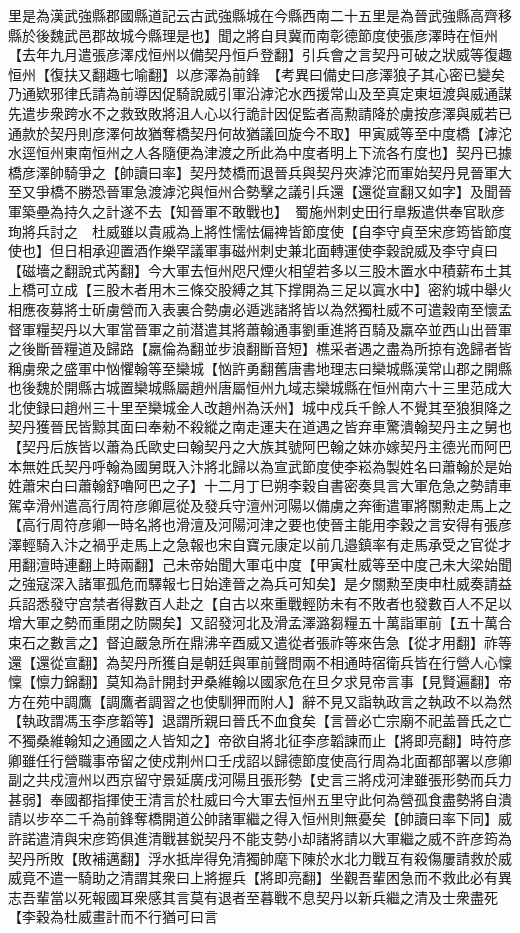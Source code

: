 里是為漢武強縣郡國縣道記云古武強縣城在今縣西南二十五里是為晉武強縣高齊移縣於後魏武邑郡故城今縣理是也】聞之將自貝冀而南彰德節度使張彦澤時在恒州【去年九月遣張彦澤戍恒州以備契丹恒戶登翻】引兵會之言契丹可破之狀威等復趣恒州【復扶又翻趣七喻翻】以彦澤為前鋒　【考異曰備史曰彦澤狼子其心密已變矣乃通欵邪律氏請為前導因促騎說威引軍沿滹沱水西援常山及至真定東垣渡與威通謀先遣步衆跨水不之救致敗將沮人心以行詭計因促監者高勲請降於虜按彦澤與威若已通款於契丹則彦澤何故猶奪橋契丹何故猶議回旋今不取】甲寅威等至中度橋【滹沱水逕恒州東南恒州之人各隨便為津渡之所此為中度者明上下流各冇度也】契丹已據橋彦澤帥騎爭之【帥讀曰率】契丹焚橋而退晉兵與契丹夾滹沱而軍始契丹見晉軍大至又爭橋不勝恐晉軍急渡滹沱與恒州合勢擊之議引兵還【還從宣翻又如字】及聞晉軍築壘為持久之計遂不去【知晉軍不敢戰也】　蜀施州刺史田行臯叛遣供奉官耿彦珣將兵討之　杜威雖以貴戚為上將性懦怯偏禆皆節度使【自李守貞至宋彦筠皆節度使也】但日相承迎置酒作樂罕議軍事磁州刺史兼北面轉運使李穀說威及李守貞曰【磁墻之翻說式芮翻】今大軍去恒州咫尺煙火相望若多以三股木置水中積薪布土其上橋可立成【三股木者用木三條交股縛之其下撑開為三足以寘水中】密約城中舉火相應夜募將士斫虜營而入表裏合勢虜必遁逃諸將皆以為然獨杜威不可遣穀南至懷孟督軍糧契丹以大軍當晉軍之前潜遣其將蕭翰通事劉重進將百騎及羸卒並西山出晉軍之後斷晉糧道及歸路【羸倫為翻並步浪翻斷音短】樵采者遇之盡為所掠有逸歸者皆稱虜衆之盛軍中忷懼翰等至欒城【忷許勇翻舊唐書地理志曰欒城縣漢常山郡之開縣也後魏於開縣古城置欒城縣屬趙州唐屬恒州九域志欒城縣在恒州南六十三里范成大北使録曰趙州三十里至欒城金人改趙州為沃州】城中戍兵千餘人不覺其至狼狽降之契丹獲晉民皆黥其面曰奉勑不殺縱之南走運夫在道遇之皆弃車驚潰翰契丹主之舅也【契丹后族皆以蕭為氏歐史曰翰契丹之大族其號阿巴翰之妹亦嫁契丹主德光而阿巴本無姓氏契丹呼翰為國舅既入汴將北歸以為宣武節度使李崧為製姓名曰蕭翰於是始姓蕭宋白曰蕭翰舒嚕阿巴之子】十二月丁巳朔李穀自書密奏具言大軍危急之勢請車駕幸滑州遣高行周符彦卿扈從及發兵守澶州河陽以備虜之奔衝遣軍將關勲走馬上之【高行周符彦卿一時名將也滑澶及河陽河津之要也使晉主能用李穀之言安得有張彦澤輕騎入汴之禍乎走馬上之急報也宋自寶元康定以前几邉鎮率有走馬承受之官從才用翻澶時連翻上時兩翻】己未帝始聞大軍屯中度【甲寅杜威等至中度己未大梁始聞之強寇深入諸軍孤危而驛報七日始達晉之為兵可知矣】是夕關勲至庚申杜威奏請益兵詔悉發守宫禁者得數百人赴之【自古以來重戰輕防未有不敗者也發數百人不足以增大軍之勢而重閉之防闕矣】又詔發河北及滑孟澤潞芻糧五十萬詣軍前【五十萬合束石之數言之】督迫嚴急所在鼎沸辛酉威又遣從者張祚等來告急【從才用翻】祚等還【還從宣翻】為契丹所獲自是朝廷與軍前聲問兩不相通時宿衛兵皆在行營人心懍懍【懔力錦翻】莫知為計開封尹桑維翰以國家危在旦夕求見帝言事【見賢遍翻】帝方在苑中調鷹【調鷹者調習之也使馴狎而附人】辭不見又詣執政言之執政不以為然【執政謂馮玉李彦韜等】退謂所親曰晉氏不血食矣【言晉必亡宗廟不祀盖晉氏之亡不獨桑維翰知之通國之人皆知之】帝欲自將北征李彦韜諫而止【將即亮翻】時符彦卿雖任行營職事帝留之使戍荆州口壬戌詔以歸德節度使高行周為北面都部署以彦卿副之共戍澶州以西京留守景延廣戌河陽且張形勢【史言三將戍河津雖張形勢而兵力甚弱】奉國都指揮使王清言於杜威曰今大軍去恒州五里守此何為營孤食盡勢將自潰請以步卒二千為前鋒奪橋開道公帥諸軍繼之得入恒州則無憂矣【帥讀曰率下同】威許諾遣清與宋彦筠俱進清戰甚鋭契丹不能支勢小却諸將請以大軍繼之威不許彦筠為契丹所敗【敗補邁翻】浮水抵岸得免清獨帥麾下陳於水北力戰互有殺傷屢請救於威威竟不遣一騎助之清謂其衆曰上將握兵【將即亮翻】坐觀吾輩困急而不救此必有異志吾輩當以死報國耳衆感其言莫有退者至暮戰不息契丹以新兵繼之清及士衆盡死【李穀為杜威畫計而不行猶可曰言